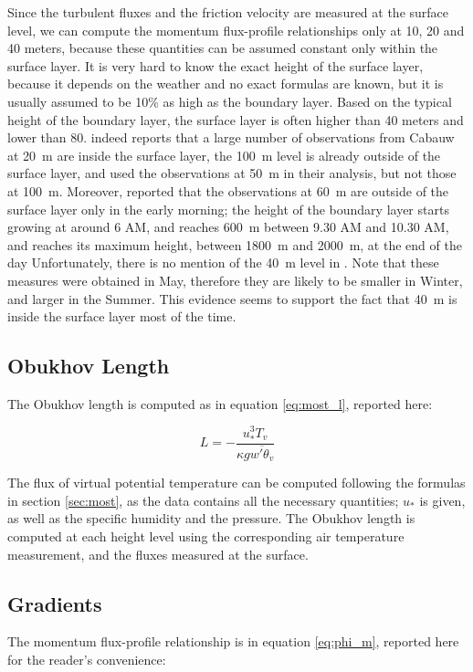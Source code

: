 \documentclass[a4paper]{book}
\begin{document}
Since the turbulent fluxes and the friction velocity are measured at the surface level, we can compute the momentum flux-profile relationships only at 10, 20 and 40 meters, because these quantities can be assumed constant only within the surface layer. It is very hard to know the exact height of the surface layer, because it depends on the weather and no exact formulas are known, but it is usually assumed to be 10\% as high as the boundary layer. Based on the typical height of the boundary layer, the surface layer is often higher than 40 meters and lower than 80. \cite{cabauw_z0} indeed reports that a large number of observations from Cabauw at \SI{20}{\meter} are inside the surface layer, the \SI{100}{\meter} level is already outside of the surface layer, and \cite{boulder} used the observations at \SI{50}{\meter} in their analysis, but not those at \SI{100}{\meter}. Moreover, \cite{cabauw60m} reported that the observations at \SI{60}{\meter} are outside of the surface layer only in the early morning; the height of the boundary layer starts growing at around 6 AM, and reaches \SI{600}{\meter} between 9.30 AM and 10.30 AM, and reaches its maximum height, between \SI{1800}{\meter} and \SI{2000}{\meter}, at the end of the day Unfortunately, there is no mention of the \SI{40}{\meter} level in \cite{cabauw60m}. Note that these measures were obtained in May, therefore they are likely to be smaller in Winter, and larger in the Summer. This evidence seems to support the fact that \SI{40}{\meter} is inside the surface layer most of the time.

\subsection{Obukhov Length}

The Obukhov length is computed as in equation \ref{eq:most_l}, reported here:

$$
L=-\frac{u_*^3 T_v}{\kappa g \overline{w'\theta_v}}
$$

The flux of virtual potential temperature can be computed following the formulas in section \ref{sec:most}, as the data contains all the necessary quantities; $u_*$ is given, as well as the specific humidity and the pressure. The Obukhov length is computed at each height level using the corresponding air temperature measurement, and the fluxes measured at the surface.


\subsection{Gradients}
\label{sec:gradients}
The momentum flux-profile relationship is in equation \ref{eq:phi_m}, reported here for the reader's convenience:
\end{document}
